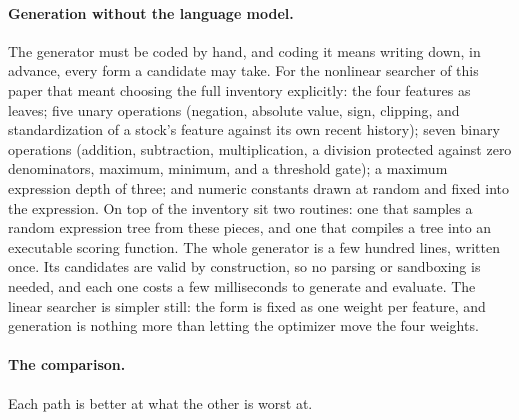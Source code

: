 \documentclass[11pt]{article}
\begin{document}
\paragraph{Generation without the language model.} The generator must be coded by hand, and coding it
means writing down, in advance, every form a candidate may take. For the nonlinear searcher of this
paper that meant choosing the full inventory explicitly: the four features as leaves; five unary
operations (negation, absolute value, sign, clipping, and standardization of a stock's feature
against its own recent history); seven binary
operations (addition, subtraction, multiplication, a division protected against zero denominators,
maximum, minimum, and a threshold gate); a maximum expression depth of three; and numeric constants
drawn at random and fixed into the expression. On top of the inventory sit two routines: one that
samples a random expression tree from these pieces, and one that compiles a tree into an executable
scoring function. The whole generator is a few hundred lines, written once. Its candidates are valid by
construction, so no parsing or sandboxing is needed, and each one costs a few milliseconds to
generate and evaluate. The linear searcher is simpler still: the form is fixed as one weight per
feature, and generation is nothing more than letting the optimizer move the four weights.

\paragraph{The comparison.} Each path is better at what the other is worst at.
\end{document}

